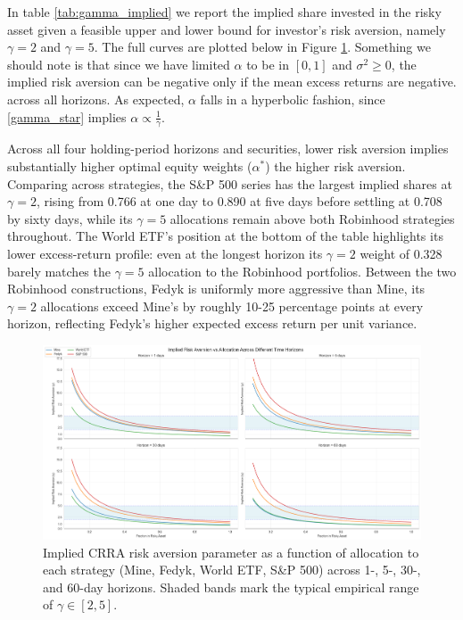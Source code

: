 In table \ref{tab:gamma_implied} we report the implied share invested in the risky asset given a feasible upper and lower bound for investor's risk aversion, namely $\gamma=2$ and $\gamma=5$.
The full curves are plotted below in Figure \ref{fig:alpha_gamma}.
Something we should note is that since we have limited $\alpha$ to be in $[0,1]$ and $\sigma^2 \geq 0$, the implied risk aversion can be negative only if the mean excess returns are negative.
across all horizons.
As expected, $\alpha$ falls in a hyperbolic fashion, since \ref{gamma_star} implies $\alpha \propto \frac{1}{\gamma}$.

Across all four holding-period horizons and securities, lower risk aversion implies substantially higher optimal equity weights ($\alpha^*$) the higher risk aversion.
Comparing across strategies, the S\&P 500 series has the largest implied shares at $\gamma=2$, rising from 0.766 at one day to 0.890 at five days before settling at 0.708 by sixty days, while its $\gamma=5$ allocations remain above both Robinhood strategies throughout. 
The World ETF's position at the bottom of the table highlights its lower excess-return profile: even at the longest horizon its $\gamma=2$ weight of 0.328 barely matches the $\gamma=5$ allocation to the Robinhood portfolios. 
Between the two Robinhood constructions, Fedyk is uniformly more aggressive than Mine, its $\gamma=2$ allocations exceed Mine's by roughly 10-25 percentage points at every horizon, reflecting Fedyk's higher expected excess return per unit variance.

\begin{figure}[H]
    \centering
    \includegraphics[width=\linewidth]{../images/alpha_gamma.png}
\caption{Implied CRRA risk aversion parameter as a function of allocation to each strategy (Mine, Fedyk, World ETF, S\&P 500) across 1-, 5-, 30-, and 60-day horizons. Shaded bands mark the typical empirical range of $\gamma \in [2,5]$.}
\label{fig:alpha_gamma}
\end{figure}    

